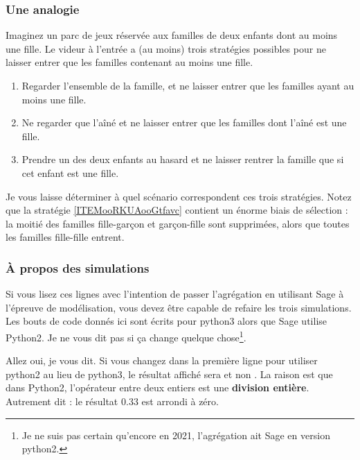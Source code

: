 \subsubsection{Une analogie}

Imaginez un parc de jeux réservée aux familles de deux enfants dont au moins une fille. Le videur à l'entrée a (au moins) trois stratégies possibles pour ne laisser entrer que les familles contenant au moins une fille.

\begin{enumerate}
    \item
        Regarder l'ensemble de la famille, et ne laisser entrer que les familles ayant au moins une fille.
    \item
        Ne regarder que l'aîné et ne laisser entrer que les familles dont l'aîné est une fille.
    \item\label{ITEMooRKUAooGtfavc}
        Prendre un des deux enfants au hasard et ne laisser rentrer la famille que si cet enfant est une fille.
\end{enumerate}

Je vous laisse déterminer à quel scénario correspondent ces trois stratégies. Notez que la stratégie \ref{ITEMooRKUAooGtfavc} contient un énorme biais de sélection : la moitié des familles fille-garçon et garçon-fille sont supprimées, alors que toutes les familles fille-fille entrent.


\subsubsection{À propos des simulations}

Si vous lisez ces lignes avec l'intention de passer l'agrégation en utilisant Sage à l'épreuve de modélisation, vous devez être capable de refaire les trois simulations. Les bouts de code donnés ici sont écrits pour python3 alors que Sage utilise Python2. Je ne vous dit pas si ça change quelque chose\footnote{Je ne suis pas certain qu'encore en 2021, l'agrégation ait Sage en version python2.}.

Allez oui, je vous dit. Si vous changez dans  la première ligne pour utiliser python2 au lieu de python3, le résultat affiché sera  et non . La raison est que dans Python2, l'opérateur \info{/} entre deux entiers est une {\bf division entière}. Autrement dit : le résultat \( 0.33\) est arrondi à zéro.

